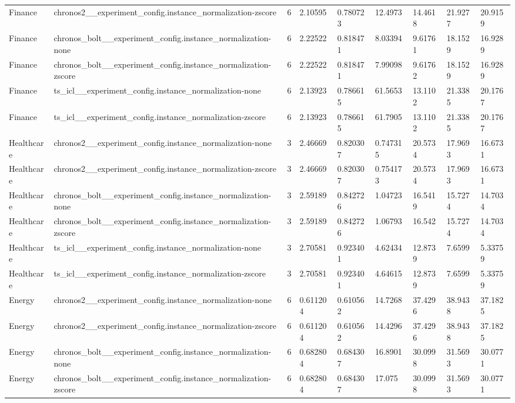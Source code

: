 \begin{tabular}{lllllllll}
Finance & chronos2\_\_experiment\_config.instance\_normalization-zscore & 6 & 2.10595 & 0.780723 & 12.4973 & 14.4618 & 21.9277 & 20.9159 \\
Finance & chronos\_bolt\_\_experiment\_config.instance\_normalization-none & 6 & 2.22522 & 0.818471 & 8.03394 & 9.61761 & 18.1529 & 16.9289 \\
Finance & chronos\_bolt\_\_experiment\_config.instance\_normalization-zscore & 6 & 2.22522 & 0.818471 & 7.99098 & 9.61762 & 18.1529 & 16.9289 \\
Finance & ts\_icl\_\_experiment\_config.instance\_normalization-none & 6 & 2.13923 & 0.786615 & 61.5653 & 13.1102 & 21.3385 & 20.1767 \\
Finance & ts\_icl\_\_experiment\_config.instance\_normalization-zscore & 6 & 2.13923 & 0.786615 & 61.7905 & 13.1102 & 21.3385 & 20.1767 \\
Healthcare & chronos2\_\_experiment\_config.instance\_normalization-none & 3 & 2.46669 & 0.820307 & 0.747315 & 20.5734 & 17.9693 & 16.6731 \\
Healthcare & chronos2\_\_experiment\_config.instance\_normalization-zscore & 3 & 2.46669 & 0.820307 & 0.754173 & 20.5734 & 17.9693 & 16.6731 \\
Healthcare & chronos\_bolt\_\_experiment\_config.instance\_normalization-none & 3 & 2.59189 & 0.842726 & 1.04723 & 16.5419 & 15.7274 & 14.7034 \\
Healthcare & chronos\_bolt\_\_experiment\_config.instance\_normalization-zscore & 3 & 2.59189 & 0.842726 & 1.06793 & 16.542 & 15.7274 & 14.7034 \\
Healthcare & ts\_icl\_\_experiment\_config.instance\_normalization-none & 3 & 2.70581 & 0.923401 & 4.62434 & 12.8739 & 7.6599 & 5.33759 \\
Healthcare & ts\_icl\_\_experiment\_config.instance\_normalization-zscore & 3 & 2.70581 & 0.923401 & 4.64615 & 12.8739 & 7.6599 & 5.33759 \\
Energy & chronos2\_\_experiment\_config.instance\_normalization-none & 6 & 0.611204 & 0.610562 & 14.7268 & 37.4296 & 38.9438 & 37.1825 \\
Energy & chronos2\_\_experiment\_config.instance\_normalization-zscore & 6 & 0.611204 & 0.610562 & 14.4296 & 37.4296 & 38.9438 & 37.1825 \\
Energy & chronos\_bolt\_\_experiment\_config.instance\_normalization-none & 6 & 0.682804 & 0.684307 & 16.8901 & 30.0998 & 31.5693 & 30.0771 \\
Energy & chronos\_bolt\_\_experiment\_config.instance\_normalization-zscore & 6 & 0.682804 & 0.684307 & 17.075 & 30.0998 & 31.5693 & 30.0771 \\

\end{tabular}
